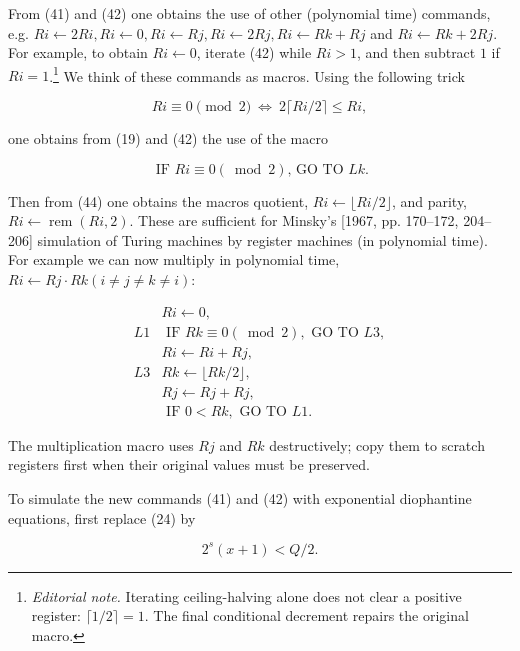 \documentclass[11pt,leqno]{article}
\newcommand{\ednote}[1]{\footnote{\textit{Editorial note.} #1}}
\begin{document}
From (41) and (42) one obtains the use of other (polynomial time) commands, e.g. $R i \leftarrow 2 R i, R i \leftarrow 0, R i \leftarrow R j, R i \leftarrow 2 R j, R i \leftarrow R k+R j$ and $R i \leftarrow R k+2 R j$. For example, to obtain $R i\leftarrow0$, iterate (42) while $R i>1$, and then subtract $1$ if $R i=1$.\ednote{Iterating ceiling-halving alone does not clear a positive register: $\lceil1/2\rceil=1$. The final conditional decrement repairs the original macro.} We think of these commands as macros. Using the following trick

\begin{equation*}
R i\equiv0\pmod2\ \Longleftrightarrow\ 2\lceil R i/2\rceil\leq R i, \tag{43}\label{eq:43}
\end{equation*}

one obtains from (19) and (42) the use of the macro

\begin{equation*}
\text { IF } R i \equiv 0(\bmod 2) \text {, GO TO } L k . \tag{44}\label{eq:44}
\end{equation*}

Then from (44) one obtains the macros quotient, $R i\leftarrow\lfloor R i/2\rfloor$, and parity, $R i \leftarrow \operatorname{rem}(R i,2)$. These are sufficient for Minsky's [1967, pp. 170--172, 204--206] simulation of Turing machines by register machines (in polynomial time). For example we can now multiply in polynomial time, $R i \leftarrow R j \cdot R k(i \neq j \neq k \neq i)$:

\[
\begin{array}{ll}
& R i \leftarrow 0,  \tag{45}\label{eq:45}\\
L 1 & \text { IF } R k \equiv 0(\bmod 2), \text { GO TO } L 3, \\
& R i \leftarrow R i+R j, \\
L 3 & R k\leftarrow\lfloor R k/2\rfloor, \\
& R j \leftarrow R j+R j, \\
& \text { IF } 0<R k, \text { GO TO } L 1 .
\end{array}
\]

The multiplication macro uses $R j$ and $R k$ destructively; copy them to scratch registers first when their original values must be preserved.

To simulate the new commands (41) and (42) with exponential diophantine equations, first replace (24) by

\begin{equation*}
2^{s}(x+1)<Q / 2 . \tag{46}\label{eq:46}
\end{equation*}
\end{document}
